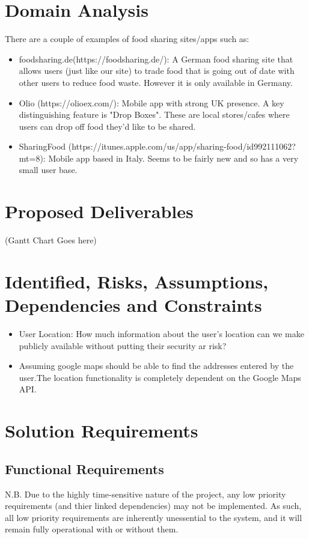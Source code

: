 \documentclass[12pt]{article}
\begin{document}
\section{Domain Analysis}
There are a couple of examples of food sharing sites/apps such as:
\begin{itemize}
    \item foodsharing.de(https://foodsharing.de/): A German food sharing site
        that allows users (just like our site) to trade food that is going out
        of date with other users to reduce food waste.
        However it is only available in Germany.
    \item Olio (https://olioex.com/): Mobile app with strong UK presence.
        A key distinguishing feature is "Drop Boxes".
        These are local stores/cafes where users can drop off food they'd like
        to be shared.
    \item SharingFood
        (https://itunes.apple.com/us/app/sharing-food/id992111062?mt=8):
        Mobile app based in Italy.
        Seems to be fairly new and so has a very small user base.
\end{itemize}


\section{Proposed Deliverables}
(Gantt Chart Goes here)

\section{Identified, Risks, Assumptions, Dependencies and Constraints}
\begin{itemize}
    \item User Location: How much information about the user's location can we
        make publicly available without putting their security ar risk?
    \item Assuming google maps should be able to find the addresses entered by
        the user.The location functionality is completely dependent on the
        Google Maps API.
\end{itemize}

\section{Solution Requirements}
\subsection{Functional Requirements}
N.B. Due to the highly time-sensitive nature of the project, any low priority
requirements (and thier linked dependencies) may not be implemented.
As such, all low priority requirements are inherently unessential to the
system, and it will remain fully operational with or without them.
\end{document}

